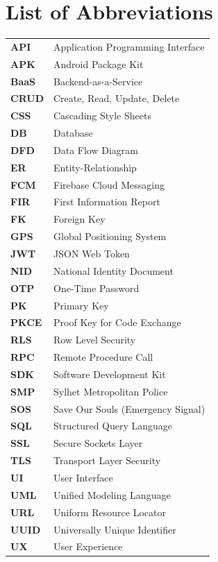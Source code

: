 \documentclass[11pt, a4paper]{report}
\begin{document}
\chapter*{List of Abbreviations}
\begin{table}[ht]
\begin{tabularx}{\textwidth}{lX}
\textbf{API} & Application Programming Interface \\
\textbf{APK} & Android Package Kit \\
\textbf{BaaS} & Backend-as-a-Service \\
\textbf{CRUD} & Create, Read, Update, Delete \\
\textbf{CSS} & Cascading Style Sheets \\
\textbf{DB} & Database \\
\textbf{DFD} & Data Flow Diagram \\
\textbf{ER} & Entity-Relationship \\
\textbf{FCM} & Firebase Cloud Messaging \\
\textbf{FIR} & First Information Report \\
\textbf{FK} & Foreign Key \\
\textbf{GPS} & Global Positioning System \\
\textbf{JWT} & JSON Web Token \\
\textbf{NID} & National Identity Document \\
\textbf{OTP} & One-Time Password \\
\textbf{PK} & Primary Key \\
\textbf{PKCE} & Proof Key for Code Exchange \\
\textbf{RLS} & Row Level Security \\
\textbf{RPC} & Remote Procedure Call \\
\textbf{SDK} & Software Development Kit \\
\textbf{SMP} & Sylhet Metropolitan Police \\
\textbf{SOS} & Save Our Souls (Emergency Signal) \\
\textbf{SQL} & Structured Query Language \\
\textbf{SSL} & Secure Sockets Layer \\
\textbf{TLS} & Transport Layer Security \\
\textbf{UI} & User Interface \\
\textbf{UML} & Unified Modeling Language \\
\textbf{URL} & Uniform Resource Locator \\
\textbf{UUID} & Universally Unique Identifier \\
\textbf{UX} & User Experience \\
\end{tabularx}
\end{table}
\clearpage
\end{document}
